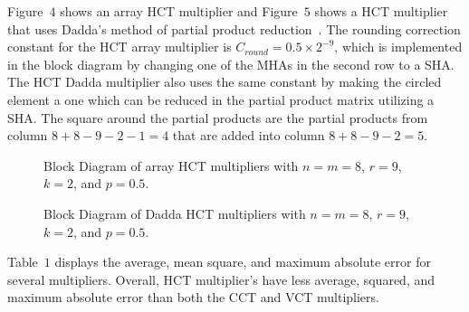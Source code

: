 Figure~$4$ shows an array HCT multiplier and Figure~$5$ shows
a HCT multiplier 
that uses Dadda's method of partial product 
reduction~\cite{dadda}. 
The rounding correction constant for the HCT array multiplier is
$C_{round} = 0.5 \times 2^{-9}$, which is implemented in the
block diagram by changing one of the 
MHAs in the second row to a SHA.
The HCT
Dadda multiplier also uses the same constant
by making the circled element a one which can be
reduced in the partial product matrix utilizing a SHA. The square
around the partial products are the partial 
products from column $8+8-9-2-1=4$
that are added into column $8+8-9-2=5$.
\begin{figure}[ht]
\begin{center}
\setlength{\unitlength}{0.0105in}%
\end{center}
\caption{Block Diagram of array HCT multipliers 
with $n=m=8$, $r=9$, $k=2$, and $p=0.5$.}
\end{figure}
\begin{figure}[ht]
\begin{center}
\setlength{\unitlength}{0.0105in}%
\end{center}
\caption{Block Diagram of Dadda HCT multipliers 
with $n=m=8$, $r=9$, $k=2$, and $p=0.5$.}
\end{figure}
Table~$1$ displays the average, mean square, and maximum absolute error
for several multipliers.  Overall, HCT multiplier's have less average,
squared, and maximum absolute error than both the CCT and VCT 
multipliers.
